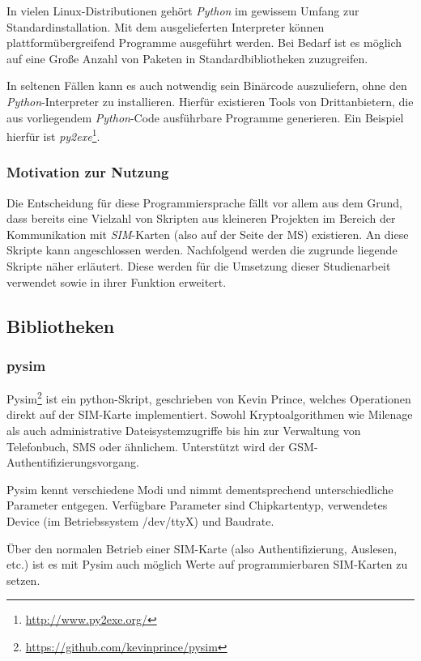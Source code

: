 In vielen Linux-Distributionen gehört \textit{Python} im gewissem Umfang zur Standardinstallation.
Mit dem ausgelieferten Interpreter können plattformübergreifend Programme ausgeführt werden. Bei
Bedarf ist es möglich auf eine Große Anzahl von Paketen in Standardbibliotheken zuzugreifen.

In seltenen Fällen kann es auch notwendig sein Binärcode auszuliefern, ohne den
\textit{Python}-Interpreter zu installieren. Hierfür existieren Tools von Drittanbietern,
die aus vorliegendem \textit{Python}-Code ausführbare Programme generieren. Ein Beispiel hierfür
ist \textit{py2exe}\footnote{\url{http://www.py2exe.org/}}.

\subsubsection{Motivation zur Nutzung}
Die Entscheidung für diese Programmiersprache fällt vor allem aus dem Grund, dass bereits eine
Vielzahl von Skripten aus kleineren Projekten im Bereich der Kommunikation mit \textit{SIM}-Karten
(also auf der Seite der \ac{MS}) existieren. An diese Skripte kann angeschlossen werden. Nachfolgend werden die zugrunde liegende
Skripte näher erläutert. Diese werden für die Umsetzung dieser Studienarbeit verwendet sowie
in ihrer Funktion erweitert.

\subsection{Bibliotheken}
\subsubsection{pysim}
\label{subsec:pysim}
Pysim\footnote{\url{https://github.com/kevinprince/pysim}} ist ein
python-Skript, geschrieben von Kevin Prince,
welches Operationen direkt auf der SIM-Karte implementiert.
Sowohl Kryptoalgorithmen wie Milenage als auch administrative Dateisystemzugriffe
bis hin zur Verwaltung von Telefonbuch, SMS oder ähnlichem.
Unterstützt wird der GSM-Authentifizierungsvorgang.

Pysim kennt verschiedene Modi und nimmt dementsprechend unterschiedliche
Parameter entgegen. Verfügbare Parameter sind Chipkartentyp, verwendetes
Device (im Betriebssystem /dev/ttyX) und Baudrate\cite{pysimprince}.

Über den normalen Betrieb einer SIM-Karte (also Authentifizierung, Auslesen, etc.)
ist es mit Pysim auch möglich Werte auf programmierbaren SIM-Karten zu setzen.

